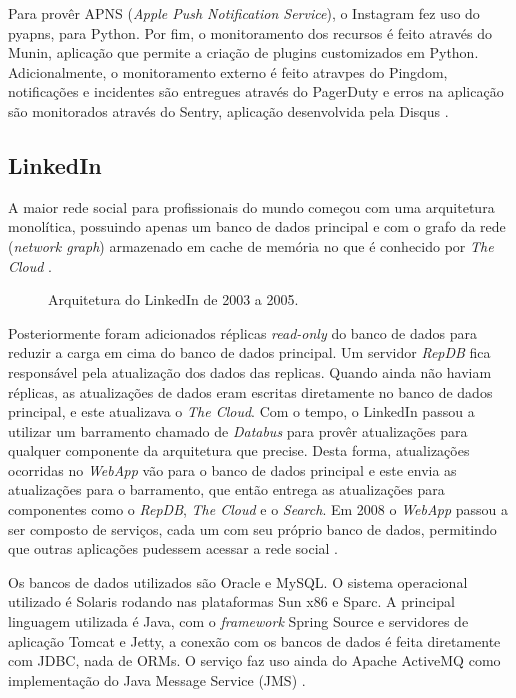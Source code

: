 \documentclass[diss]{template/setrem}
\begin{document}
Para provêr APNS (\emph{Apple Push Notification Service}), o Instagram fez uso do pyapns, para Python. Por fim, o monitoramento dos recursos é feito através do Munin, aplicação que permite a criação de plugins customizados em Python. Adicionalmente, o monitoramento externo é feito atravpes do Pingdom, notificações e incidentes são entregues através do PagerDuty e erros na aplicação são monitorados através do Sentry, aplicação desenvolvida pela Disqus \citep{Instagram2011}.

\subsection{LinkedIn}
A maior rede social para profissionais do mundo começou com uma arquitetura monolítica, possuindo apenas um banco de dados principal e com o grafo da rede (\emph{network graph}) armazenado em cache de memória no que é conhecido por \emph{The Cloud} \citep{Hurvitz2008}.

\begin{figure}[!h]
    \caption{Arquitetura do LinkedIn de 2003 a 2005.}
    \label{fig:linkedin-old-architecture}
\end{figure}

Posteriormente foram adicionados réplicas \emph{read-only} do banco de dados para reduzir a carga em cima do banco de dados principal. Um servidor \emph{RepDB} fica responsável pela atualização dos dados das replicas. Quando ainda não haviam réplicas, as atualizações de dados eram escritas diretamente no banco de dados principal, e este atualizava o \emph{The Cloud}. Com o tempo, o LinkedIn passou a utilizar um barramento chamado de \emph{Databus} para provêr atualizações para qualquer componente da arquitetura que precise. Desta forma, atualizações ocorridas no \emph{WebApp} vão para o banco de dados principal e este envia as atualizações para o barramento, que então entrega as atualizações para componentes como o \emph{RepDB}, \emph{The Cloud} e o \emph{Search}. Em 2008 o \emph{WebApp} passou a ser composto de serviços, cada um com seu próprio banco de dados, permitindo que outras aplicações pudessem acessar a rede social \citep{Hurvitz2008}.

Os bancos de dados utilizados são Oracle e MySQL. O sistema operacional utilizado é Solaris rodando nas plataformas Sun x86 e Sparc. A principal linguagem utilizada é Java, com o \emph{framework} Spring Source e servidores de aplicação Tomcat e Jetty, a conexão com os bancos de dados é feita diretamente com JDBC, nada de ORMs. O serviço faz uso ainda do Apache ActiveMQ como implementação do Java Message Service (JMS) \citep{Hurvitz2008}.
\end{document}
